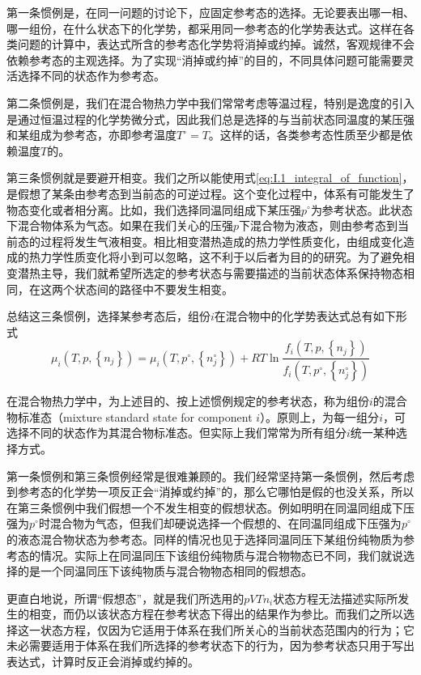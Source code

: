 \documentclass[main.tex]{subfiles}
\begin{document}
第一条惯例是，在同一问题的讨论下，应固定参考态的选择。无论要表出哪一相、哪一组份，在什么状态下的化学势，都采用同一参考态的化学势表达式。这样在各类问题的计算中，表达式所含的参考态化学势将消掉或约掉。诚然，客观规律不会依赖参考态的主观选择。为了实现“消掉或约掉”的目的，不同具体问题可能需要灵活选择不同的状态作为参考态。

第二条惯例是，我们在混合物热力学中我们常常考虑等温过程，特别是逸度的引入是通过恒温过程的化学势微分式，因此我们总是选择的与当前状态同温度的某压强和某组成为参考态，亦即参考温度$T^\circ=T$。这样的话，各类参考态性质至少都是依赖温度$T$的。

第三条惯例就是要避开相变。我们之所以能使用式\eqref{eq:I.1_integral_of_function}，是假想了某条由参考态到当前态的可逆过程。这个变化过程中，体系有可能发生了物态变化或者相分离。比如，我们选择同温同组成下某压强$p^\circ$为参考状态。此状态下混合物体系为气态。如果在我们关心的压强$p$下混合物为液态，则由参考态到当前态的过程将发生气液相变。相比相变潜热造成的热力学性质变化，由组成变化造成的热力学性质变化将小到可以忽略，这不利于以后者为目的的研究。为了避免相变潜热主导，我们就希望所选定的参考状态与需要描述的当前状态体系保持物态相同，在这两个状态间的路径中不要发生相变。

总结这三条惯例，选择某参考态后，组份$i$在混合物中的化学势表达式总有如下形式
\begin{equation}\label{eq:II.4_mu_standard_state}
    \mu_i\left(T,p,\left\{n_j\right\}\right)=\mu_i\left(T,p^\circ,\left\{n_j^\circ\right\}\right)+RT\ln\frac{f_i\left(T,p,\left\{n_j\right\}\right)}{f_i\left(T,p^\circ,\left\{n_j^\circ\right\}\right)}
\end{equation}

在混合物热力学中，为上述目的、按上述惯例规定的参考状态，称为组份$i$的混合物标准态（mixture standard state for component $i$）。原则上，为每一组分$i$，可选择不同的状态作为其混合物标准态。但实际上我们常常为所有组分$i$统一某种选择方式。

第一条惯例和第三条惯例经常是很难兼顾的。我们经常坚持第一条惯例，然后考虑到参考态的化学势一项反正会“消掉或约掉”的，那么它哪怕是假的也没关系，所以在第三条惯例中我们假想一个不发生相变的假想状态。例如明明在同温同组成下压强为$p^\circ$时混合物为气态，但我们却硬说选择一个假想的、在同温同组成下压强为$p^\circ$的液态混合物状态为参考态。同样的情况也见于选择同温同压下某组份纯物质为参考态的情况。实际上在同温同压下该组份纯物质与混合物物态已不同，我们就说选择的是一个同温同压下该纯物质与混合物物态相同的假想态。

更直白地说，所谓“假想态”，就是我们所选用的$pVTn_i$状态方程无法描述实际所发生的相变，而仍以该状态方程在参考状态下得出的结果作为参比。而我们之所以选择这一状态方程，仅因为它适用于体系在我们所关心的当前状态范围内的行为；它未必需要适用于体系在我们所选择的参考状态下的行为，因为参考状态只用于写出表达式，计算时反正会消掉或约掉的。
\end{document}
